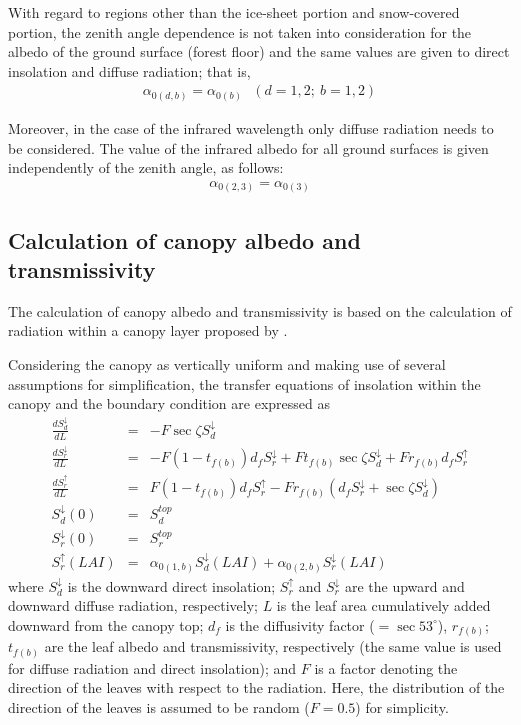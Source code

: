 With regard to regions other than the ice-sheet portion and snow-covered portion, the zenith angle dependence is not taken into consideration for the albedo of the ground surface (forest floor) and
the same values are given to direct insolation and diffuse radiation; that is, \begin{eqnarray}
 \alpha_{0(d,b)} = \alpha_{0(b)}\ \ \ (d=1,2;\ b=1,2)
\end{eqnarray}

Moreover, in the case of the infrared wavelength only diffuse radiation needs to be considered. The value of the infrared albedo for all ground surfaces is given independently of the zenith angle, as
follows: \begin{eqnarray}
 \alpha_{0(2,3)} = \alpha_{0(3)}
\end{eqnarray}

\subsection{Calculation of canopy albedo and transmissivity}\label{calculation-of-canopy-albedo-and-transmissivity}

The calculation of canopy albedo and transmissivity is based on the calculation of radiation within a canopy layer proposed by \citet{Watanabe1995-je}.

Considering the canopy as vertically uniform and making use of several assumptions for simplification, the transfer equations of insolation within the canopy and the boundary condition are expressed
as \begin{eqnarray}
 \frac{dS^{\downarrow}_d}{dL} &=& -F \sec\zeta S^{\downarrow}_d \\
 \frac{dS^{\downarrow}_r}{dL} &=& -F (1-t_{f(b)})d_f S^{\downarrow}_r
                                  +F t_{f(b)} \sec\zeta S^{\downarrow}_d
                                  +F r_{f(b)} d_f S^{\uparrow}_r \\
 \frac{dS^{\uparrow}_r}{dL}   &=&  F (1-t_{f(b)})d_f S^{\uparrow}_r
                                  -F r_{f(b)} ( d_f S^{\downarrow}_r
                                         + \sec\zeta S^{\downarrow}_d ) \\
 S^{\downarrow}_d(0) &=& S^{top}_d \\
 S^{\downarrow}_r(0) &=& S^{top}_r \\
 S^{\uparrow}_r(LAI) &=& \alpha_{0(1,b)}S^{\downarrow}_d(LAI)
                       + \alpha_{0(2,b)}S^{\downarrow}_r(LAI)
\end{eqnarray} where \(S^{\downarrow}_d\) is the downward direct insolation; \(S^{\uparrow}_r\) and \(S^{\downarrow}_r\) are the upward and downward diffuse radiation, respectively; \(L\) is the leaf area
cumulatively added downward from the canopy top; \(d_f\) is the diffusivity factor (\(=\sec 53^{\circ}\)), \(r_{f(b)}\); \(t_{f(b)}\) are the leaf albedo and transmissivity, respectively (the same
value is used for diffuse radiation and direct insolation); and \(F\) is a factor denoting the direction of the leaves with respect to the radiation. Here, the distribution of the direction of the
leaves is assumed to be random (\(F=0.5\)) for simplicity.

